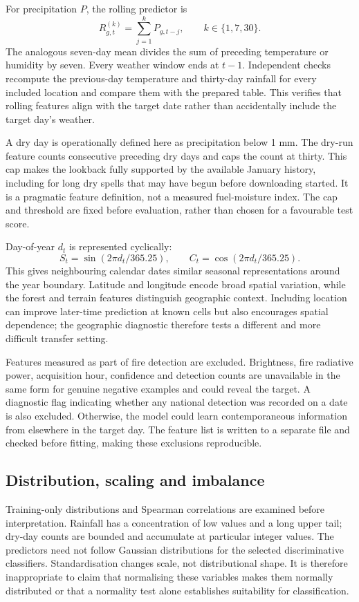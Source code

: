 \documentclass[conference,a4paper]{IEEEtran}
\begin{document}
For precipitation $P$, the rolling predictor is
\begin{equation}
R^{(k)}_{g,t}=\sum_{j=1}^{k}P_{g,t-j},\qquad k\in\{1,7,30\}.
\end{equation}
The analogous seven-day mean divides the sum of preceding temperature or humidity by seven. Every weather window ends at $t-1$. Independent checks recompute the previous-day temperature and thirty-day rainfall for every included location and compare them with the prepared table. This verifies that rolling features align with the target date rather than accidentally include the target day's weather.

A dry day is operationally defined here as precipitation below 1 mm. The dry-run feature counts consecutive preceding dry days and caps the count at thirty. This cap makes the lookback fully supported by the available January history, including for long dry spells that may have begun before downloading started. It is a pragmatic feature definition, not a measured fuel-moisture index. The cap and threshold are fixed before evaluation, rather than chosen for a favourable test score.

Day-of-year $d_t$ is represented cyclically:
\begin{equation}
S_t=\sin(2\pi d_t/365.25),\qquad C_t=\cos(2\pi d_t/365.25).
\end{equation}
This gives neighbouring calendar dates similar seasonal representations around the year boundary. Latitude and longitude encode broad spatial variation, while the forest and terrain features distinguish geographic context. Including location can improve later-time prediction at known cells but also encourages spatial dependence; the geographic diagnostic therefore tests a different and more difficult transfer setting.

Features measured as part of fire detection are excluded. Brightness, fire radiative power, acquisition hour, confidence and detection counts are unavailable in the same form for genuine negative examples and could reveal the target. A diagnostic flag indicating whether any national detection was recorded on a date is also excluded. Otherwise, the model could learn contemporaneous information from elsewhere in the target day. The feature list is written to a separate file and checked before fitting, making these exclusions reproducible.

\subsection{Distribution, scaling and imbalance}
Training-only distributions and Spearman correlations are examined before interpretation. Rainfall has a concentration of low values and a long upper tail; dry-day counts are bounded and accumulate at particular integer values. The predictors need not follow Gaussian distributions for the selected discriminative classifiers. Standardisation changes scale, not distributional shape. It is therefore inappropriate to claim that normalising these variables makes them normally distributed or that a normality test alone establishes suitability for classification.
\end{document}

